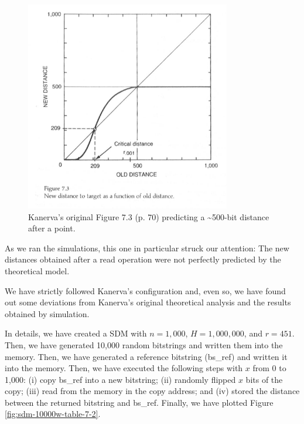 \begin{figure}[h]
\centering\includegraphics[width=0.8\textwidth]{images02/kanerva-table-7-2-original.png}
\caption{Kanerva's original Figure 7.3 (p. 70) predicting a \textasciitilde 500-bit distance after a point.
\label{fig:kanerva-figure-7.3}}
\end{figure}

As we ran the simulations, this one in particular struck our attention: The new distances obtained after a read operation were not perfectly predicted by the theoretical model.

We have strictly followed Kanerva's configuration and, even so, we have found out some deviations from Kanerva's original theoretical analysis and the results obtained by simulation.

In details, we have created a SDM with $n=1,000$, $H=1,000,000$, and $r=451$. Then, we have generated 10,000 random bitstrings and written them into the memory. Then, we have generated a reference bitstring (bs\_ref) and written it into the memory. Then, we have executed the following steps with $x$ from 0 to 1,000: (i) copy bs\_ref into a new bitstring; (ii) randomly flipped $x$ bits of the copy; (iii) read from the memory in the copy address; and (iv) stored the distance between the returned bitstring and bs\_ref. Finally, we have plotted Figure \ref{fig:sdm-10000w-table-7-2}.

